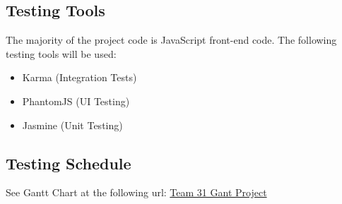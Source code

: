 \subsection{Testing Tools}
The majority of the project code is JavaScript front-end code. The following testing tools will be used:
\begin{itemize}
	\item Karma (Integration Tests)
	\item PhantomJS (UI Testing)
	\item Jasmine (Unit Testing) 
\end{itemize}


\subsection{Testing Schedule}
	
	
	See Gantt Chart at the following url: \href{https://gitlab.cas.mcmaster.ca/myersd1/3xa3-team31/blob/master/ProjectSchedule/Team%2031%20Gantt%20Project.pdf}{Team 31 Gant Project}


